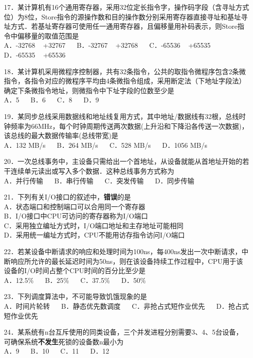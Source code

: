 17．某计算机有16个通用寄存器，采用32位定长指令字，操作码字段（含寻址方式位）为8位，Store指令的源操作数和目的操作数分别采用寄存器直接寻址和基址寻址方式．若基址寄存器可使用任一通用寄存器，且偏移量用补码表示，则Store指令中偏移量的取值范围是 \\
A．-32768 ~ +32767 $\quad$ B．-32767 ~ +32768 $\quad$ C．-65536 ~ +65535 $\quad$ D．-65535 ~ +65536

18．某计算机采用微程序控制器，共有32条指令，公共的取指令微程序包含2条微指令，各指令对应的微程序平均由4条微指令组成，采用断定法（下地址字段法）确定下条微指令地址，则微指令中下址字段的位数至少是 \\
A．5 $\quad$ B．6 $\quad$ C．8 $\quad$ D．9

19．某同步总线采用数据线和地址线复用方式，其中地址/数据线有32根，总线时钟频率为66MHz，每个时钟周期传送两次数据(上升沿和下降沿各传送一次数据)，该总线的最大数据传输率(总线带宽)是 \\
A．132 MB/s $\quad$ B．264 MB/s $\quad$ C．528 MB/s $\quad$ D．1056 MB/s

20．一次总线事务中，主设备只需给出一个首地址，从设备就能从首地址开始的若干连续单元读出或写入多个数据．这种总线事务方式称为 \\
A．并行传输 $\quad$ B．串行传输 $\quad$ C．突发传输 $\quad$ D．同步传输

21．下列有关I/O接口的叙述中，\textbf{错误}的是 \\
A．状态端口和控制端口可以合用同一个寄存器 \\
B．I/O接口中CPU可访问的寄存器称为I/O端口 \\
C．采用独立编址方式时，I/O端口地址和主存地址可能相同 \\
D．采用统一编址方式时，CPU不能用访存指令访问I/O端口

22．若某设备中断请求的响应和处理时间为100ns，每400ns发出一次中断请求，中断响应所允许的最长延迟时间为50ns，则在该设备持续工作过程中，CPU用于该设备的I/O时间占整个CPU时间的百分比至少是 \\
A．12.5\% $\quad$ B．25\% $\quad$ C．37.5\% $\quad$ D．50\%

23．下列调度算法中，不可能导致饥饿现象的是 \\
A．时间片轮转 $\quad$ B．静态优先数调度 $\quad$ C．非抢占式短作业优先 $\quad$ D．抢占式短作业优先

24．某系统有n台互斥使用的同类设备，三个并发进程分别需要3、4、5台设备，可确保系统\textbf{不发生}死锁的设备数n最小为 \\
A．9 $\quad$ B．10 $\quad$ C．11 $\quad$ D．12

